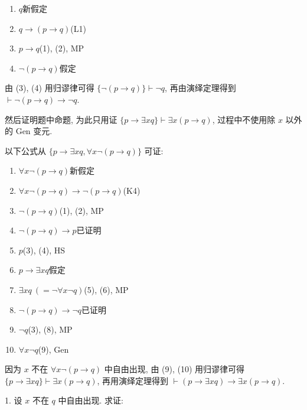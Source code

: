 \documentclass[boxes]{homework}
\begin{document}
\begin{solution}
\begin{enumerate}[parsep = 0pt, itemsep = .25em, topsep = .25em]
              \begin{enumerate}[label = (\arabic*), parsep = 0pt, itemsep = 0pt, topsep = .25em]
                  \item $q$\hfill 新假定
                  \item $q\to (p\to q)$\hfill (L1)
                  \item $p\to q$\hfill (1), (2), MP
                  \item $\lnot (p\to q)$\hfill 假定
              \end{enumerate}
              由 (3), (4) 用归谬律可得 $\{\lnot(p\to q)\}\vdash \lnot q$, 再由演绎定理得到 $\vdash \lnot (p\to q)\to \lnot q$.
    \end{enumerate}

    然后证明题中命题, 为此只用证 $\{p\to\exists xq\}\vdash\exists x(p\to q)$, 过程中不使用除 $x$ 以外的 Gen 变元.

    以下公式从 $\{p\to\exists xq, \forall x\lnot(p\to q)\}$ 可证:
    \begin{enumerate}[label = (\arabic*), parsep = 0pt, itemsep = 0pt, topsep = .25em]
        \item $\forall x\lnot (p\to q)$\hfill 新假定
        \item $\forall x\lnot (p\to q)\to \lnot(p\to q)$\hfill (K4)
        \item $\lnot (p\to q)$\hfill (1), (2), MP
        \item $\lnot (p\to q)\to p$\hfill 已证明
        \item $p$\hfill (3), (4), HS
        \item $p\to \exists xq$\hfill 假定
        \item $\exists xq\ (=\lnot \forall x\lnot q)$\hfill (5), (6), MP
        \item $\lnot (p\to q)\to \lnot q$\hfill 已证明
        \item $\lnot q$\hfill (3), (8), MP
        \item $\forall x\lnot q$\hfill (9), Gen
    \end{enumerate}
    因为 $x$ 不在 $\forall x\lnot (p\to q)$ 中自由出现, 由 (9), (10) 用归谬律可得 $\{p\to \exists xq\}\vdash \exists x(p\to q)$, 再用演绎定理得到 $\vdash (p\to \exists xq)\to \exists x(p\to q)$.
\end{solution}
\begin{problem}
    1. 设 $x$ 不在 $q$ 中自由出现. 求证:
\end{problem}
\end{document}
